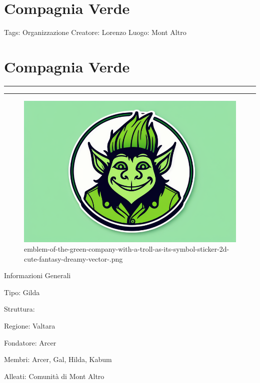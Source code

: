 \section{Compagnia Verde}\label{compagnia-verde}

Tags: Organizzazione Creatore: Lorenzo Luogo: Mont Altro

\section{Compagnia Verde}\label{compagnia-verde-1}

\begin{center}\rule{0.5\linewidth}{0.5pt}\end{center}

\begin{center}\rule{0.5\linewidth}{0.5pt}\end{center}

\begin{figure}
\centering
\includegraphics{emblem-of-the-green-company-with-a-troll-as-its-symbol-sticker-2d-cute-fantasy-dreamy-vector-.png}
\caption{emblem-of-the-green-company-with-a-troll-as-its-symbol-sticker-2d-cute-fantasy-dreamy-vector-.png}
\end{figure}

Informazioni Generali

Tipo: Gilda

Struttura:

Regione: Valtara

Fondatore: Arcer

Membri: Arcer, Gal, Hilda, Kabum

Alleati: Comunità di Mont Altro

